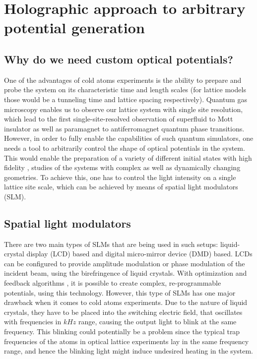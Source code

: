 
\chapter{Holographic approach to arbitrary potential generation}

\section{Why do we need custom optical potentials?}
One of the advantages of cold atoms experiments is the ability to prepare and probe the system on its characteristic time and length scales (for lattice models those would be a tunneling time and lattice spacing respectively). Quantum gas microscopy enables us to observe our lattice system with single site resolution, which lead to the first single-site-resolved observation of superfluid to Mott insulator \cite{Bakr2010, Sherson2010} as well as paramagnet to antiferromagnet \cite{Simon2011, Parsons2016} quantum phase transitions. However, in order to fully enable the capabilities of such quantum simulators, one needs a tool to arbitrarily control the shape of optical potentials in the system. This would enable the preparation of a variety of different initial states with high fidelity \cite{us, somebody else?}, studies of the systems with complex \cite{Tilman QPC, Roatti QPC} as well as dynamically changing \cite{Boyer2006} geometries. To achieve this, one has to control the light intensity on a single lattice site scale, which can be achieved by means of spatial light modulators (SLM).

\section{Spatial light modulators}
There are two main types of SLMs that are being used in such setups: liquid-crystal display (LCD) based and digital micro-mirror device (DMD) based. LCDs can be configured to provide amplitude modulation or phase modulation of the incident beam, using the birefringence of liquid crystals. With optimization and feedback algorithms \cite{Gaunt2012, Nogrette2014}, it is possible to create complex, re-programmable potentials, using this technology. However, this type of SLMs has one major drawback when it comes to cold atoms experiments. Due to the nature of liquid crystals, they have to be placed into the switching electric field, that oscillates with frequencies in $kHz$ range, causing the output light to blink at the same frequency. This blinking could potentially be a problem since the typical trap frequencies of the atoms in optical lattice experiments lay in the same frequency range, and hence the blinking light might induce undesired heating in the system.

